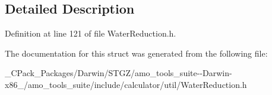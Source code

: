 \subsection{Detailed Description}


Definition at line 121 of file Water\+Reduction.\+h.



The documentation for this struct was generated from the following file\+:\begin{DoxyCompactItemize}
\item 
\+\_\+\+C\+Pack\+\_\+\+Packages/\+Darwin/\+S\+T\+G\+Z/amo\+\_\+tools\+\_\+suite-\/-\/\+Darwin-\/x86\+\_/amo\+\_\+tools\+\_\+suite/include/calculator/util/Water\+Reduction.\+h\end{DoxyCompactItemize}
